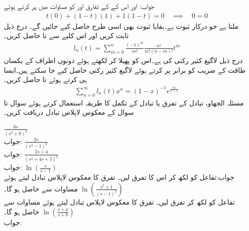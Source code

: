 جواب: اور اس کے کے تفارق  اور  کو مساوات میں پر کرتے ہوئے
\begin{align*}
t(0)+(1-t)(1)+1(1-t)=0\quad \implies \quad 0=0
\end{align*} 
ملتا ہے جو درکار ثبوت ہے۔بقایا ثبوت بھی اسی طرح حاصل کیے جائیں گے۔
درج ذیل ثابت کریں اور اس کلیے سے  تا  حاصل کریں۔
\begin{align}
l_n(t)=\sum_{m=0}^{n}\frac{(-1)^m}{m!}\frac{n!}{m!(n-m)!}t^m
\end{align}
درج ذیل لاگیغ کثیر رکنی کی  ہے۔اس کو پھیلا کر لکھتے ہوئے دونوں اطراف  کے یکساں طاقت کے  ضریب  کو برابر پر کرتے ہوئے لاگیغ کثیر رکنی حاصل کیے جا سکتے ہیں۔ایسا ہی کرتے ہوئے  تا  حاصل کریں۔
\begin{align}
\sum_{n=0}^{\infty}l_n(t)x^n=(1-x)^{-1} e^{\frac{tx}{x-1}}
\end{align} 
مسئلہ الجھاو، تبادل کے  تفرق یا تبادل کے تکمل کا طریقہ استعمال کرتے ہوئے  سوال  تا سوال  کے معکوس لاپلاس تبادل دریافت کریں۔

\quad
$\frac{6s}{(s^2+9)^2}$\\
جواب:
\quad
$\frac{2s}{(s^2-1)^2}$\\
جواب:
\quad
$\frac{2s+4}{(s^2+4s+5)^2}$\\
جواب:
\quad
$\ln \left(\frac{s}{s-1}\right)$\\
جواب:تفاعل کو  لکھ کر اس کا تفرق لیں۔ تفرق کا معکوس لاپلاس تبادل لیتے ہوئے مساوات  سے  حاصل ہو گا۔
\quad
$\ln\left(\frac{s^2+1}{(s-1)^2}\right)$\\
تفاعل کو  لکھ کر تفرق لیں۔ تفرق کا معکوس لاپلاس تبادل لیتے ہوئے مساوات  سے  حاصل ہو گا۔
\quad
$\ln \left(\frac{s+a}{s+b}\right)$\\
جواب:

